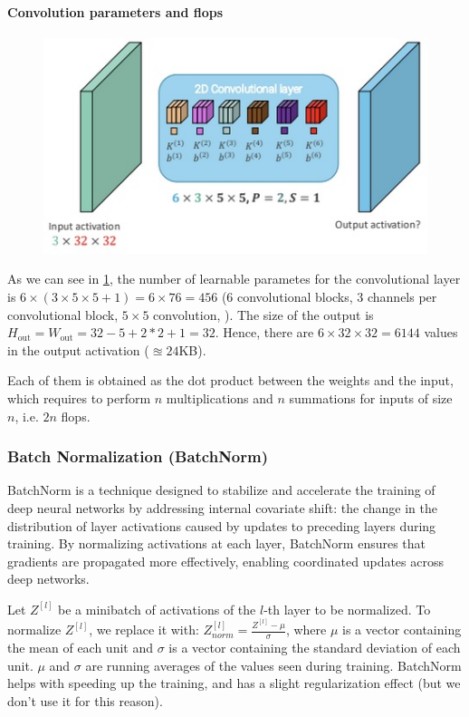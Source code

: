\paragraph{Convolution parameters and flops}

\begin{figure}[htbp]
  \centering
  \includegraphics[width=0.6\linewidth]{./img/convolutions_flops.jpg}
  \label{fig:convolutions_flops}
\end{figure}

As we can see in \ref{fig:convolutions_flops}, the number of learnable parametes for the convolutional layer is $6 \times (3 \times 5 \times 5 + 1) = 6 \times 76 = 456$ (6 convolutional blocks, 3 channels per convolutional block, $5 \times 5$ convolution, ).
The size of the output is $H_\text{{out}} = W_\text{{out}} = 32 - 5 + 2 * 2 + 1 = 32$.
Hence, there are $6 \times 32 \times 32 = 6144$ values in the output activation ($\approxeq 24$KB).

Each of them is obtained as the dot product between the weights and the input, which requires to perform $n$ multiplications and $n$ summations for inputs of size $n$, i.e. $2n$ flops.

\subsubsection{Batch Normalization (BatchNorm)}
BatchNorm is a technique designed to stabilize and accelerate the training of deep neural networks by addressing internal covariate shift: the change in the distribution of layer activations caused by updates to preceding layers during training.
By normalizing activations at each layer, BatchNorm ensures that gradients are propagated more effectively, enabling coordinated updates across deep networks.

Let $Z^{[l]}$ be a minibatch of activations of the $l$-th layer to be normalized.
To normalize $Z^{[l]}$, we replace it with: $Z^{[l]}_{norm} = \frac{Z^{[l]} - \mu}{\sigma}$, where $\mu$ is a vector containing the mean of each unit and $\sigma$ is a vector containing the standard deviation of each unit.
$\mu$ and $\sigma$ are running averages of the values seen during training.
BatchNorm helps with speeding up the training, and has a slight regularization effect (but we don't use it for this reason).

